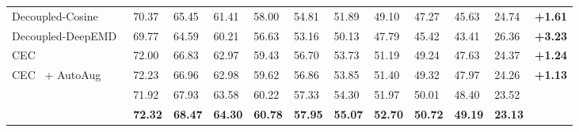 \begin{table*}[t]
{{\begin{tabular}{llllllllllll}
				Decoupled-Cosine~\cite{vinyals2016matching}  & 70.37  & 65.45      & 61.41     & 58.00  & 54.81   & 51.89  & 49.10   & 47.27     & 45.63    & 24.74 & \bf +1.61   \\
				Decoupled-DeepEMD~\cite{zhang2020deepemd}    & 69.77   & 64.59     & 60.21    & 56.63  & 53.16   & 50.13  & 47.79  & 45.42     & 43.41    & 26.36   & \bf +3.23   \\
				CEC~\cite{zhang2021few}                    & 72.00   & 66.83     & 62.97   & 59.43  & 56.70   &53.73  & 51.19   & 49.24     & 47.63   & 24.37   & \bf +1.24     \\
				CEC~\cite{zhang2021few} + AutoAug                    & 72.23   & 66.96     & 62.98   & 59.62  & 56.86   &53.85  & 51.40   & 49.32     & 47.97   & 24.26   & \bf +1.13     \\
				\midrule
				\mame                & 71.92   & 67.93     & 63.58   & 60.22  & 57.33   &54.30  & 51.97   & 50.01     & 48.40   & 23.52   &     \\
				\name              & \bf 72.32   & \bf 68.47     & \bf64.30    & \bf60.78  & \bf57.95   &\bf55.07  & \bf52.70  &\bf 50.72     & \bf 49.19   & \bf23.13   &   \\
				\bottomrule
				
			\end{tabular}
	}}
\end{table*}


